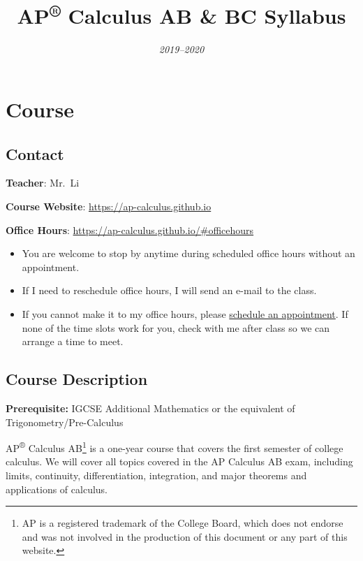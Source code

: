 \documentclass[12pt,fleqn]{article}
\title{AP\textsuperscript{®} Calculus AB \& BC Syllabus}
\author{}
\date{\emph{2019--2020}}
\providecommand{\tightlist}{%
  \setlength{\itemsep}{0pt}\setlength{\parskip}{0pt}}
\let\rmarkdownfootnote\footnote%
\def\footnote{\protect\rmarkdownfootnote}
\begin{document}
\maketitle

{
\setcounter{tocdepth}{2}
\tableofcontents
}
\hypertarget{course}{%
\section{Course}\label{course}}

\hypertarget{contact}{%
\subsection{Contact}\label{contact}}

\textbf{Teacher}: Mr.~Li

\textbf{Course Website}: \url{https://ap-calculus.github.io}

\textbf{Office Hours}: \url{https://ap-calculus.github.io/\#officehours}

\begin{itemize}
\tightlist
\item
  You are welcome to stop by anytime during scheduled office hours without an appointment.
\item
  If I need to reschedule office hours, I will send an e-mail to the class.
\item
  If you cannot make it to my office hours, please \href{https://ap-calculus.github.io/\#officehours}{schedule an appointment}. If none of the time slots work for you, check with me after class so we can arrange a time to meet.
\end{itemize}

\hypertarget{course-description}{%
\subsection{Course Description}\label{course-description}}

\textbf{Prerequisite:} IGCSE Additional Mathematics or the equivalent of Trigonometry/Pre-Calculus

AP\textsuperscript{®} Calculus AB\footnote{AP is a registered trademark of the College Board, which does not endorse and was not involved in the production of this document or any part of this website.} is a one-year course that covers the first semester of college calculus. We will cover all topics covered in the AP Calculus AB exam, including limits, continuity, differentiation, integration, and major theorems and applications of calculus.
\end{document}
